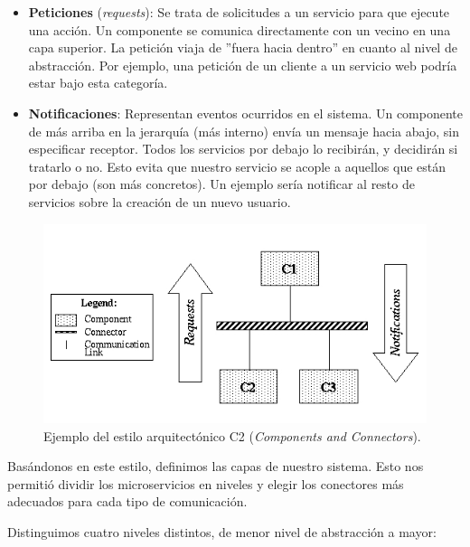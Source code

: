 \begin{itemize}
  \item \textbf{Peticiones} (\emph{requests}): Se trata de solicitudes a un servicio para que ejecute una acción. Un componente se comunica directamente con un vecino en una capa superior. La petición viaja de ''fuera hacia dentro'' en cuanto al nivel de abstracción. Por ejemplo, una petición de un cliente a un servicio web podría estar bajo esta categoría.

  \item \textbf{Notificaciones}: Representan eventos ocurridos en el sistema. Un componente de más arriba en la jerarquía (más interno) envía un mensaje hacia abajo, sin especificar receptor. Todos los servicios por debajo lo recibirán, y decidirán si tratarlo o no. Esto evita que nuestro servicio se acople a aquellos que están por debajo (son más concretos). Un ejemplo sería notificar al resto de servicios sobre la creación de un nuevo usuario.
\end{itemize}

\begin{figure}[htb]
  \centering
  \includegraphics[scale=0.45]{03_arquitectura/images/c2SampleArch}
  \caption[Ejemplo del estilo arquitectónico C2 (\emph{Components and Connectors})]{Ejemplo del estilo arquitectónico C2 (\emph{Components and Connectors}). \cite{UCISoftwareArchitecture}}
  \label{fig:C2-arch-example}
\end{figure}

Basándonos en este estilo, definimos las capas de nuestro sistema. Esto nos permitió dividir los microservicios en niveles y elegir los conectores más adecuados para cada tipo de comunicación.

Distinguimos cuatro niveles distintos, de menor nivel de abstracción a mayor:

